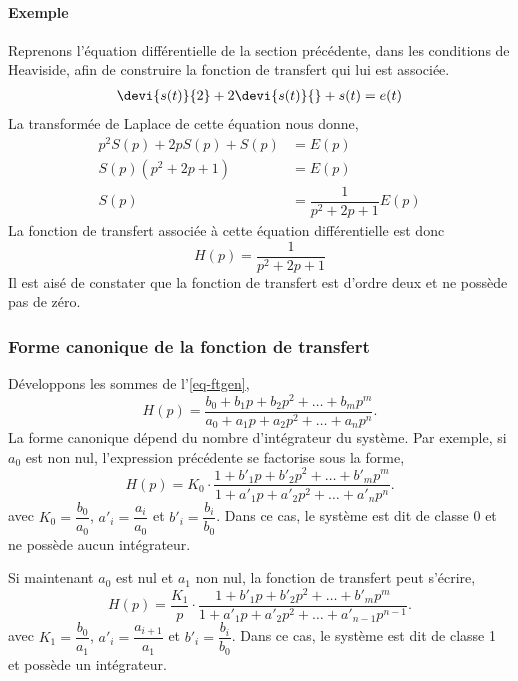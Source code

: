 \paragraph{Exemple}
Reprenons l'équation différentielle de la section précédente, dans 
les conditions de Heaviside, afin de construire la fonction de 
transfert qui lui est associée. 
\begin{align}
\devi{s(t)}{2}+2\devi{s(t)}{} + s(t) = e(t)
\end{align}
La transformée de Laplace de cette équation nous donne,
\begin{align*}
	p^2S(p)+2pS(p)+S(p)&=E(p)\\
	S(p)\left(p^2+2p+1\right)&=E(p)\\
	S(p)&=\dfrac{1}{p^2+2p+1}E(p)
\end{align*}
La fonction de transfert associée à cette équation différentielle est donc 
\[
    H(p)=\dfrac{1}{p^2+2p+1}
\]
Il est aisé de constater que la fonction de transfert est d'ordre deux 
et ne possède pas de zéro.
\subsubsection{Forme canonique de la fonction de transfert}
Développons les sommes de l'\cref{eq-ftgen},
\[
    H(p)=\dfrac{b_0+b_1p+b_2p^2+\ldots+b_mp^m}{a_0+a_1p+a_2p^2+\ldots+a_np^n}.
\]
La forme canonique dépend du nombre d'intégrateur du système. 
Par exemple, si $a_0$ est non nul, l'expression précédente se factorise 
sous la forme,
\[
    H(p)=K_0\cdot\dfrac{1+b'_1p+b'_2p^2+\ldots+b'_mp^m}
                       {1+a'_1p+a'_2p^2+\ldots+a'_np^n}.
\]
avec $K_0=\dfrac{b_0}{a_0}$, $a'_i=\dfrac{a_i}{a_0}$ et 
$b'_i=\dfrac{b_i}{b_0}$. Dans ce cas, le système est dit de 
classe 0 et ne possède aucun intégrateur.

Si maintenant $a_0$ est nul et $a_1$ non nul, la fonction de transfert 
peut s'écrire,
\[
    H(p)=\dfrac{K_1}{p}
    \cdot
    \dfrac{1+b'_1p+b'_2p^2+\ldots+b'_mp^m}
          {1+a'_1p+a'_2p^2+\ldots+a'_{n-1}p^{n-1}}.
\]
avec $K_1=\dfrac{b_0}{a_1}$, $a'_i=\dfrac{a_{i+1}}{a_1}$ et 
$b'_i=\dfrac{b_i}{b_0}$. Dans ce cas, le système est dit de classe 1 
et possède un intégrateur.

